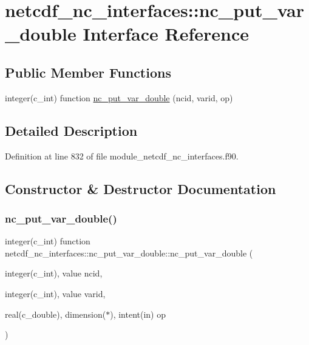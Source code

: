 \hypertarget{interfacenetcdf__nc__interfaces_1_1nc__put__var__double}{}\section{netcdf\+\_\+nc\+\_\+interfaces\+:\+:nc\+\_\+put\+\_\+var\+\_\+double Interface Reference}
\label{interfacenetcdf__nc__interfaces_1_1nc__put__var__double}
\subsection*{Public Member Functions}
\begin{DoxyCompactItemize}
\item 
integer(c\+\_\+int) function \hyperlink{interfacenetcdf__nc__interfaces_1_1nc__put__var__double_acd18c06cf4aa31cfcd6c17ffb192c921}{nc\+\_\+put\+\_\+var\+\_\+double} (ncid, varid, op)
\end{DoxyCompactItemize}


\subsection{Detailed Description}


Definition at line 832 of file module\+\_\+netcdf\+\_\+nc\+\_\+interfaces.\+f90.



\subsection{Constructor \& Destructor Documentation}
\mbox{\label{interfacenetcdf__nc__interfaces_1_1nc__put__var__double_acd18c06cf4aa31cfcd6c17ffb192c921}} 
\subsubsection{\texorpdfstring{nc\+\_\+put\+\_\+var\+\_\+double()}{nc\_put\_var\_double()}}
{\footnotesize\ttfamily integer(c\+\_\+int) function netcdf\+\_\+nc\+\_\+interfaces\+::nc\+\_\+put\+\_\+var\+\_\+double\+::nc\+\_\+put\+\_\+var\+\_\+double (\begin{DoxyParamCaption}\item[{integer(c\+\_\+int), value}]{ncid,  }\item[{integer(c\+\_\+int), value}]{varid,  }\item[{real(c\+\_\+double), dimension($\ast$), intent(in)}]{op }\end{DoxyParamCaption})}



